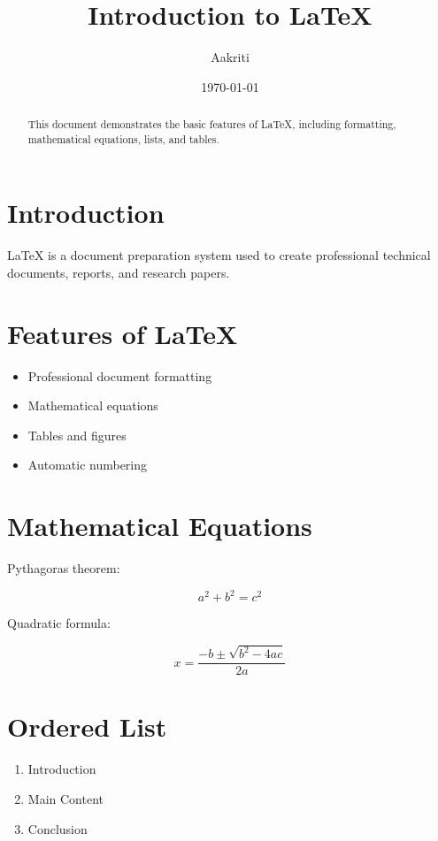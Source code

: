 \documentclass[12pt,a4paper]{article}
\title{\textbf{Introduction to LaTeX}}
\author{Aakriti}
\date{\today}
\begin{document}
\maketitle

\begin{abstract}
This document demonstrates the basic features of LaTeX,
including formatting, mathematical equations, lists, and tables.
\end{abstract}

\tableofcontents
\newpage

\section{Introduction}

LaTeX is a document preparation system used to create
professional technical documents, reports, and research papers.

\section{Features of LaTeX}

\begin{itemize}
    \item Professional document formatting
    \item Mathematical equations
    \item Tables and figures
    \item Automatic numbering
\end{itemize}

\section{Mathematical Equations}

Pythagoras theorem:

\[
a^2+b^2=c^2
\]

Quadratic formula:

\[
x=\frac{-b\pm\sqrt{b^2-4ac}}{2a}
\]

\section{Ordered List}

\begin{enumerate}
    \item Introduction
    \item Main Content
    \item Conclusion
\end{enumerate}
\end{document}
